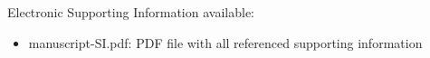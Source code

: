 


\begin{tocentry}
\end{tocentry}


\begin{abstract}
\end{abstract}


\begin{acknowledgement}
\end{acknowledgement}


\begin{suppinfo}

    Electronic Supporting Information available:
    \begin{itemize}
      \item manuscript-SI.pdf: PDF file with all referenced supporting information
    \end{itemize}
    
\end{suppinfo}